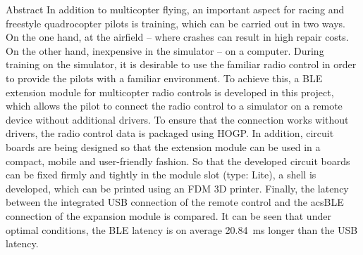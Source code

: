 \begin{abstractpage}
    \begin{abstractsection}{Abstract}
      In addition to multicopter flying, an important aspect for racing and freestyle quadrocopter pilots is training, which can be carried out in two ways. On the one hand, at the airfield -- where crashes can result in high repair costs. On the other hand, inexpensive in the simulator -- on a computer. During training on the simulator, it is desirable to use the familiar radio control in order to provide the pilots with a familiar environment. To achieve this, a \acs{BLE} extension module for multicopter radio controls is developed in this project, which allows the pilot to connect the radio control to a simulator on a remote device without additional drivers. To ensure that the connection works without drivers, the radio control data is packaged using \acs{HOGP}. In addition, circuit boards are being designed so that the extension module can be used in a compact, mobile and user-friendly fashion. So that the developed circuit boards can be fixed firmly and tightly in the module slot (type: Lite), a shell is developed, which can be printed using an \acs{FDM} 3D printer. Finally, the latency between the integrated \acs{USB} connection of the remote control and the acs{BLE} connection of the expansion module is compared. It can be seen that under optimal conditions, the \acs{BLE} latency is on average 20.84~ms longer than the \acs{USB} latency. 
    \end{abstractsection}
\end{abstractpage}